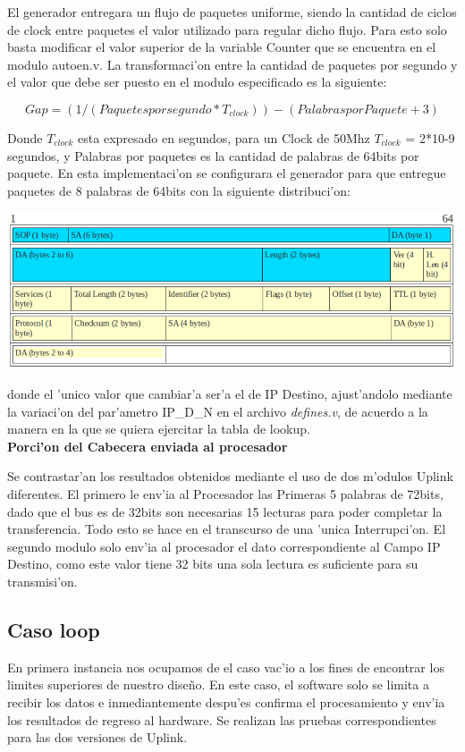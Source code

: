 \documentclass[12pt,spanish]{article}
\begin{document}
El generador entregara un flujo de paquetes uniforme, siendo la cantidad de ciclos de clock entre paquetes el valor utilizado para
 regular dicho flujo. Para esto solo basta modificar el valor superior de la variable Counter que se encuentra en el modulo autoen.v.
La transformaci'on entre la cantidad de paquetes por segundo y el valor que debe ser puesto en el modulo especificado es la siguiente:

\[  Gap=(1/(Paquetes por segundo * T_{clock})) - ( Palabras por Paquete + 3) \] 

Donde $T_{clock}$ esta expresado en segundos, para un Clock de 50Mhz $T_{clock}$   = 2*10-9  segundos, y Palabras por paquetes es la cantidad 
de palabras de 64bits por paquete. En esta implementaci'on se configurara el generador para que entregue paquetes de 8 palabras de 
64bits con la siguiente distribuci'on: 

\begin{center}
	\includegraphics[width=1\textwidth]{graf/frame.png}
\end{center}

donde el 'unico valor que cambiar'a ser'a el de IP Destino, ajust'andolo mediante la variaci'on del par'ametro
IP\_D\_N en el archivo \textit{defines.v}, de acuerdo a la manera en la que se quiera ejercitar la tabla de lookup.
\\

\textbf{Porci'on del  Cabecera enviada al procesador}

Se contrastar'an los resultados obtenidos mediante el uso de dos m'odulos Uplink diferentes. El primero le env'ia al Procesador 
las Primeras 5 palabras de 72bits, dado que el bus es de 32bits son necesarias 15 lecturas para poder completar la transferencia.
 Todo esto se hace en el transcurso de una 'unica Interrupci'on. El segundo modulo solo env'ia al procesador 
el dato correspondiente al Campo IP Destino, como este valor tiene 32 bits una sola lectura es suficiente para su transmisi'on. 



\subsection*{Caso loop}
En primera instancia nos ocupamos de el caso vac'io a los fines de encontrar los limites superiores de nuestro dise\~no.  En este caso, 
el software solo se limita a recibir los datos e inmediantemente despu'es confirma el procesamiento y env'ia los resultados de regreso 
al hardware. Se realizan las pruebas correspondientes para las dos versiones de Uplink.
\end{document}

